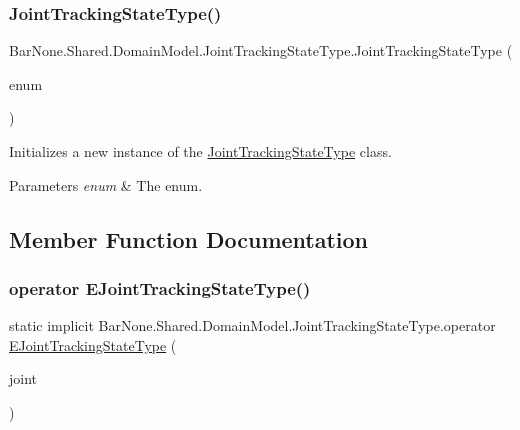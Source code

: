 \subsubsection{\texorpdfstring{Joint\+Tracking\+State\+Type()}{JointTrackingStateType()}\hspace{0.1cm}{\footnotesize\ttfamily [2/2]}}
{\footnotesize\ttfamily Bar\+None.\+Shared.\+Domain\+Model.\+Joint\+Tracking\+State\+Type.\+Joint\+Tracking\+State\+Type (\begin{DoxyParamCaption}\item[{\mbox{\hyperlink{namespace_bar_none_1_1_shared_1_1_domain_model_abfb99d1de9684cc3f024f727b2a2b487}{E\+Joint\+Tracking\+State\+Type}} @}]{enum }\end{DoxyParamCaption})}



Initializes a new instance of the \mbox{\hyperlink{class_bar_none_1_1_shared_1_1_domain_model_1_1_joint_tracking_state_type}{Joint\+Tracking\+State\+Type}} class. 


\begin{DoxyParams}{Parameters}
{\em enum} & The enum.\\
\hline
\end{DoxyParams}


\subsection{Member Function Documentation}
\mbox{\label{class_bar_none_1_1_shared_1_1_domain_model_1_1_joint_tracking_state_type_a4dcda9a8ba330a9567c10d76b54c3663}} 
\subsubsection{\texorpdfstring{operator E\+Joint\+Tracking\+State\+Type()}{operator EJointTrackingStateType()}}
{\footnotesize\ttfamily static implicit Bar\+None.\+Shared.\+Domain\+Model.\+Joint\+Tracking\+State\+Type.\+operator \mbox{\hyperlink{namespace_bar_none_1_1_shared_1_1_domain_model_abfb99d1de9684cc3f024f727b2a2b487}{E\+Joint\+Tracking\+State\+Type}} (\begin{DoxyParamCaption}\item[{\mbox{\hyperlink{class_bar_none_1_1_shared_1_1_domain_model_1_1_joint_tracking_state_type}{Joint\+Tracking\+State\+Type}}}]{joint }\end{DoxyParamCaption})\hspace{0.3cm}{\ttfamily [static]}}



